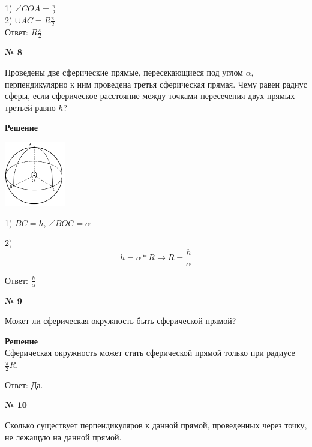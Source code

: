     1) $\angle COA = \frac{\pi}{2}$\\

    2) $\cup AC = R\frac{\pi}{2}$\\

    Ответ: $R\frac{\pi}{2}$

    \begin{center}
        \textbf{№ 8}
    \end{center}

    Проведены две сферические прямые, пересекающиеся под углом $\alpha$,
    перпендикулярно к ним проведена третья сферическая прямая.
    Чему равен радиус сферы, если сферическое расстояние между точками пересечения
    двух прямых третьей равно $h$?

    \textbf{Решение}\\

    \begin{center}
        \includegraphics[width=0.2\textwidth]{images/img14}\\
    \end{center}

    1) $BC = h$, $\angle BOC = \alpha$

    2) \[
           h  = \alpha * R \rightarrow R = \frac{h}{\alpha}

    \]

    Ответ: $\frac{h}{\alpha}$

    \begin{center}
        \textbf{№ 9}
    \end{center}

    Может ли сферическая окружность быть сферической прямой?

    \textbf{Решение}\\

    Сферическая окружность может стать сферической прямой только при радиусе $\frac{\pi}{2}R$.

    Ответ: Да.

    \begin{center}
        \textbf{№ 10}
    \end{center}

    Сколько существует перпендикуляров к данной прямой, проведенных через точку,
    не лежащую на данной прямой.

